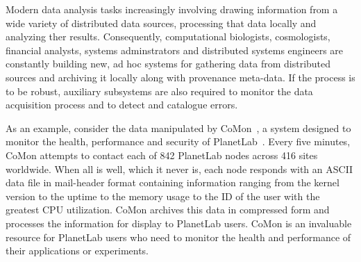 
Modern data analysis tasks increasingly involving drawing information from
a wide variety of distributed data sources, processing that data locally
and analyzing ther results.  Consequently,
computational biologists, cosmologists, financial analysts, systems
adminstrators and distributed systems engineers are constantly building
new, ad hoc systems for gathering data from distributed sources and
archiving it locally along with provenance meta-data.  If the process
is to be robust, auxiliary subsystems are also required to monitor the
data acquisition process and to detect and catalogue errors.

As an example, consider the data
manipulated by CoMon~\cite{comon}, a system designed to monitor the
health, performance and security of PlanetLab~\cite{planetlab}.  Every
five minutes, CoMon attempts to contact each of 842 PlanetLab nodes
across 416 sites worldwide.%
% 
When all is well, which it never is, each node responds with
an ASCII data file in mail-header format containing information
ranging from the kernel version to the uptime to the memory usage to
the ID of the user with the greatest CPU utilization.  CoMon archives
this data in compressed form and processes the information
for display to PlanetLab users.  CoMon is an invaluable resource for
PlanetLab users who need to monitor the health and performance of their
applications or experiments.


